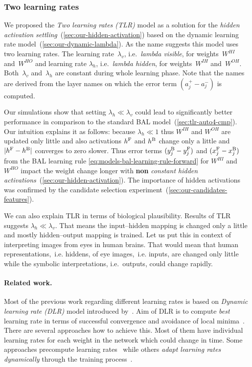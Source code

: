 
\subsubsection{Two learning rates} 
\label{sec:our-tlr}

We proposed the \emph{Two learning rates (TLR)} model as a solution for the \emph{hidden activation settling}~(\ref{sec:our-hidden-activation}) based on the dynamic learning rate model~(\ref{sec:our-dynamic-lambda}). As the name suggests this model uses two learning rates. The learning rate~$\lambda_v$, i.e.~\emph{lambda visible}, for weights~$W^{HI}$ and~$W^{HO}$ and learning rate $\lambda_h$, i.e.~\emph{lambda hidden}, for weights~$W^{IH}$ and~$W^{OH}$. Both~$\lambda_v$ and~$\lambda_h$ are constant during whole learning phase. Note that the names are derived from the layer names on which the error term $(a^{+}_j - a^{-}_j)$ is computed. 

Our simulations show that setting $\lambda_h \ll \lambda_v$ could lead to significantly better performance in comparison to the standard BAL model~(\ref{sec:tlr-auto4-cmp}). Our intuition explains it as follows: because $\lambda_h \ll 1$ thus $W^{IH}$ and $W^{OH}$ are updated only little and also activations $h^{\rm F}$ and $h^{\rm B}$ change only a little and $|h^{\rm F}- h^{\rm B}|$ converges to zero slower. Thus error terms $(y_j^{\rm B} - y_j^{\rm F})$ and $(x_j^{\rm F} - x_j^{\rm B})$ from the BAL learning rule \ref{eq:models-bal-learning-rule-forward} for $W^{HI}$ and $W^{HO}$ impact the weight change longer with {\bf non} \emph{constant hidden activations}~(\ref{sec:our-hidden-activation}). The importance of hidden activations was confirmed by the candidate selection experiment~(\ref{sec:our-candidates-features}). 

We can also explain TLR in terms of biological plausibility. Results of TLR suggests $\lambda_h \ll \lambda_v$. That means the input--hidden mapping is changed only a little and mostly hidden--output mapping is trained. Let us put this in context of interpreting images from eyes in human brains. That would mean that human representations,~i.e. hiddens, of eye images,~i.e. inputs, are changed only little while the symbolic interpretations, i.e.~outputs, could change rapidly. 

\paragraph{Related work.} 
\label{sec:our-tlr-related-work}
Most of the previous work regarding different learning rates is based on \emph{Dynamic learning rate (DLR)} model introduced by~\citet{jacobs1988increased}. Aim of DLR is to compute \emph{best} learning rate in terms of successful convergence and avoidance of local minima~\citep{behera2006adaptive}. There are several approaches how to achieve this. Most of them have individual learning rates for each weight in the network which could change in time. Some approaches precompute learning rates~\citep{weir1991method} while others \emph{adapt learning rates dynamically} through the training process~\citep{yu1997efficient, magoulas1999improving, yu2002backpropagation}.

